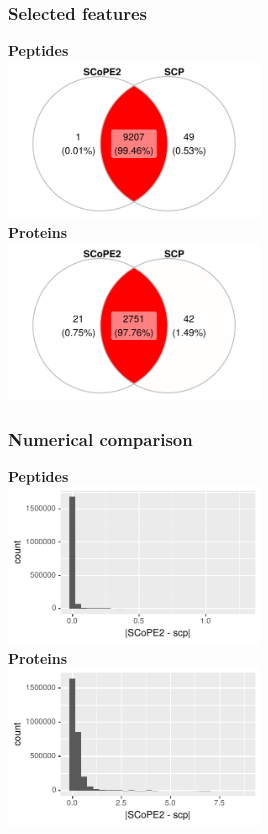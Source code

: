 \documentclass{beamer}
\newcommand{\frametitlesection}[1]{\frametitle{\centering #1 \footnotesize \hspace{0pt plus 1 filll} \insertsection}}
\begin{document}
\begin{frame}
    \frametitlesection{Selected features}
    
    \centering
    \textbf{Peptides} \\
    \includegraphics[width=0.5\textwidth]{figs/Benchmark_pep_venn.pdf} \\
    \textbf{Proteins}\\
    \includegraphics[width=0.5\textwidth]{figs/Benchmark_prot_venn.pdf}
    
\end{frame}

\begin{frame}
    \frametitlesection{Numerical comparison}
    
    \centering
    \textbf{Peptides} \\
    \includegraphics[width=0.5\textwidth]{figs/Benchmark_pep_err.pdf} \\
    \textbf{Proteins}\\
    \includegraphics[width=0.5\textwidth]{figs/Benchmark_prot_err.pdf}
    
\end{frame}
\end{document}
